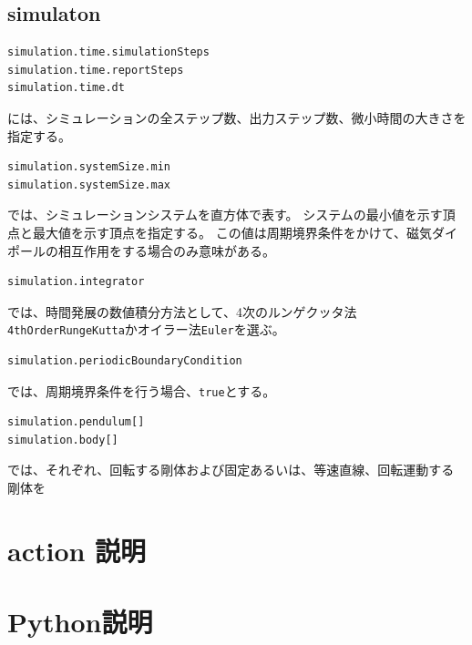 \documentclass[a4paper,11pt]{jbook}
\begin{document}
\section{simulaton}
\begin{verbatim}
simulation.time.simulationSteps
simulation.time.reportSteps
simulation.time.dt
\end{verbatim}
には、シミュレーションの全ステップ数、出力ステップ数、微小時間の大きさを指定する。
\begin{verbatim}
simulation.systemSize.min
simulation.systemSize.max
\end{verbatim}
では、シミュレーションシステムを直方体で表す。
システムの最小値を示す頂点と最大値を示す頂点を指定する。
この値は周期境界条件をかけて、磁気ダイポールの相互作用をする場合のみ意味がある。
\begin{verbatim}
simulation.integrator
\end{verbatim}
では、時間発展の数値積分方法として、4次のルンゲクッタ法\verb|4thOrderRungeKutta|かオイラー法\verb|Euler|を選ぶ。
\begin{verbatim}
simulation.periodicBoundaryCondition
\end{verbatim}
では、周期境界条件を行う場合、\verb|true|とする。
\begin{verbatim}
simulation.pendulum[]
simulation.body[]
\end{verbatim}
では、それぞれ、回転する剛体および固定あるいは、等速直線、回転運動する剛体を
 \chapter{action 説明}
  
\chapter{Python説明}
  
\end{document}
